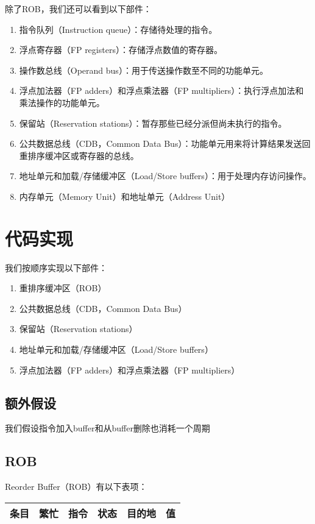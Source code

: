 \documentclass{article}
\begin{document}
除了ROB，我们还可以看到以下部件：
\begin{enumerate}
    \item 指令队列（Instruction queue）：存储待处理的指令。
    \item 浮点寄存器（FP registers）：存储浮点数值的寄存器。
    \item 操作数总线（Operand bus）：用于传送操作数至不同的功能单元。
    \item 浮点加法器（FP adders）和浮点乘法器（FP multipliers）：执行浮点加法和乘法操作的功能单元。
    \item 保留站（Reservation stations）：暂存那些已经分派但尚未执行的指令。
    \item 公共数据总线（CDB，Common Data Bus）：功能单元用来将计算结果发送回重排序缓冲区或寄存器的总线。
    \item 地址单元和加载/存储缓冲区（Load/Store buffers）：用于处理内存访问操作。
    \item 内存单元（Memory Unit）和地址单元（Address Unit）
\end{enumerate}

\section{代码实现}
我们按顺序实现以下部件：
\begin{enumerate}
    \item 重排序缓冲区（ROB）
    \item 公共数据总线（CDB，Common Data Bus）
    \item 保留站（Reservation stations）
    \item 地址单元和加载/存储缓冲区（Load/Store buffers）
    \item 浮点加法器（FP adders）和浮点乘法器（FP multipliers） 
    
\end{enumerate}

\subsection{额外假设}
我们假设指令加入buffer和从buffer删除也消耗一个周期
\subsection{ROB}
Reorder Buffer（ROB）有以下表项：\\

\begin{tabular}{|c|c|c|c|c|c|}
    \hline
    条目 & 繁忙 & 指令 & 状态 & 目的地 & 值 \\\hline
\end{tabular}
\\
\end{document}
